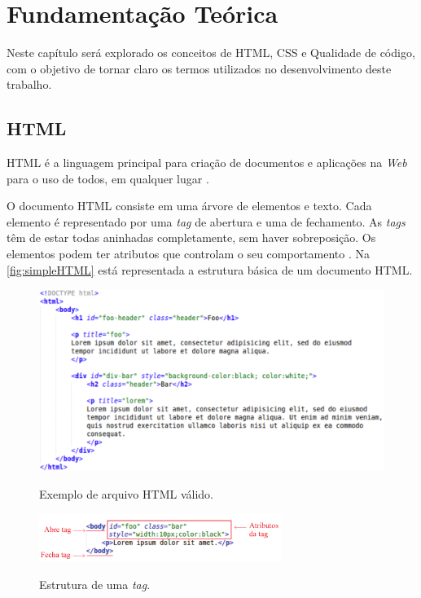 %
%

\chapter{Fundamentação Teórica}
\label{chap:fund-teor}

Neste capítulo será explorado os conceitos de HTML, CSS e Qualidade de código, com o objetivo de tornar claro os termos utilizados no desenvolvimento deste trabalho.

\section{HTML}
\label{sec:html}
HTML é a linguagem principal para criação de documentos e aplicações na \textit{Web} para o uso de todos, em qualquer lugar \cite{W3Chtml2015}.

O documento HTML consiste em uma árvore de elementos e texto. Cada elemento é representado por uma \textit{tag} de abertura e uma de fechamento. As \textit{tags} têm de estar todas aninhadas completamente, sem haver sobreposição. Os elementos podem ter atributos que controlam o seu comportamento \cite{HTMLspec2014}. Na \autoref{fig:simpleHTML} está representada a estrutura básica de um documento HTML.

\begin{figure}[!htb]
	\centering
	\caption{Exemplo de arquivo HTML válido.}
	\includegraphics[width=1\textwidth]{./04-figuras/html_simples}
	\label{fig:simpleHTML}
\end{figure}

\begin{figure}[!htb]
	\centering
	\caption{Estrutura de uma \textit{tag}.}
	\includegraphics[width=0.7\textwidth]{./04-figuras/tag_element_attr_marked}
	\label{fig:tagStruct}
\end{figure}


